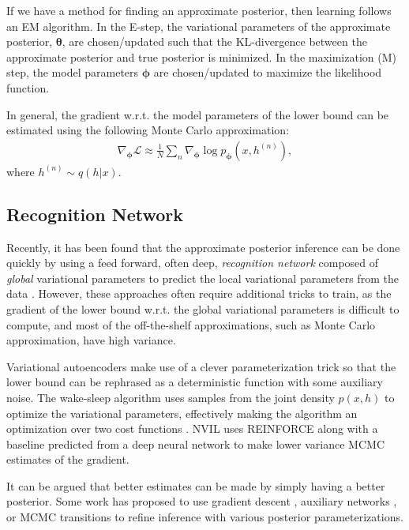 \documentclass{article} %
\newcommand{\vects}[1]{\boldsymbol{#1}}
\newcommand{\TT}[0]{\vects{\theta}}
\newcommand{\PP}[0]{\vects{\phi}}
\newcommand{\LL}[0]{\mathcal{L}}
\begin{document}
If we have a method for finding an approximate posterior, then learning follows an
EM algorithm.  In the E-step, the variational parameters of the approximate posterior, $\TT$,
are chosen/updated such that the KL-divergence between the approximate posterior and
true posterior is minimized. In the maximization (M) step, the model parameters
$\PP$ are chosen/updated to maximize the likelihood function.

In general, the gradient w.r.t. the model parameters of the lower bound can be
estimated using the following Monte Carlo approximation:
\begin{align} \label{eq:grad}
\nabla_{\PP} \LL \approx \frac{1}{N} \sum_n \nabla_{\PP} \log p_{\PP}(x, h^{(n)}),
\end{align}
where $h^{(n)} \sim q(h|x)$.

\subsection{Recognition Network}

Recently, it has been found that the approximate posterior inference can be done
quickly by using a feed forward, often deep, \emph{recognition network} composed
of \emph{global} variational parameters to predict the local variational
parameters from the data \citep[see,
e.g.,][]{kingma2013auto,mnih2014neural,rezende2014stochastic}. However, these
approaches often require additional tricks to train, as the gradient of the
lower bound w.r.t. the global variational parameters is difficult to compute,
and most of the off-the-shelf approximations, such as Monte Carlo approximation,
have high variance. 

Variational autoencoders \citep[VAE,][]{kingma2013auto} make use of a clever
parameterization trick so that the lower bound can be rephrased as a
deterministic function with some auxiliary noise. The wake-sleep algorithm uses
samples from the joint density $p(x, h)$ to optimize the variational parameters,
effectively making the algorithm an optimization over two cost functions
\citep{hinton1995wake}. NVIL
uses REINFORCE \citep{williams1992simple} along with a baseline predicted from a deep neural network to
make lower variance MCMC estimates of the gradient.

It can be argued that better estimates can be made by simply having a better
posterior. Some work has proposed to use gradient descent
\citep{hoffman2013stochastic}, auxiliary networks
\citep{rezende2015variational}, or MCMC transitions \citep{salimans2014markov}
to refine inference with various posterior parameterizations. 
\end{document}
